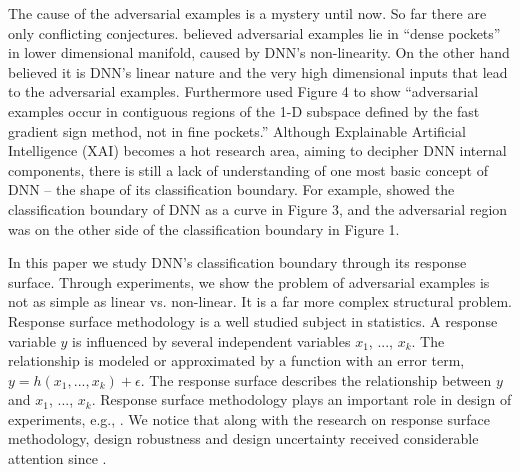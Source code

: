 \documentclass[12pt]{article}
\begin{document}
The cause of the adversarial examples is a mystery until now. So far there
are only conflicting conjectures.  
\cite{attack-LBFGS,explain-adexample-2019} believed adversarial
examples lie in ``dense pockets'' in lower dimensional manifold, caused
by DNN's non-linearity. On the other hand
\cite{explain-adexample-2015} believed it is DNN's linear nature
and the very high dimensional inputs that lead to the adversarial
examples.
Furthermore \cite{explain-adexample-2015} used Figure 4 to show ``adversarial
examples occur in contiguous regions of the 1-D subspace defined by
the fast gradient sign method, not in fine pockets.'' 
Although Explainable Artificial Intelligence
(XAI) becomes a hot research area, aiming to decipher DNN internal
components, there is still a lack of
understanding of one most basic concept of DNN -- the shape of its
classification boundary.
For example, \cite{transferable-adexample-space-2017} showed
the classification boundary of DNN as a curve in Figure 3, and the
adversarial region was on the other side of the classification boundary in
Figure 1. 

In this paper we study DNN's classification boundary through its
response surface. Through experiments, we show the problem of
adversarial examples is not as simple as linear vs. non-linear. It is
a far more complex structural problem. 
Response surface methodology is a well studied subject in
statistics. A response variable $y$ is influenced by several
independent variables $x_1$, ..., $x_k$. The relationship is modeled
or approximated by a function with an error term,
$y=h(x_1,...,x_k)+\epsilon$. The response surface describes the
relationship between $y$ and $x_1$, ..., $x_k$. 
Response surface methodology plays an important role in
design of experiments, e.g.,  
\cite{response-surface-2010,book-response-surface-2016}. We notice
that along with the research on response surface methodology, 
design robustness and design uncertainty received considerable
attention since
\cite{box-draper-1959,box-draper-1963,box-draper-1975}.
\end{document}
